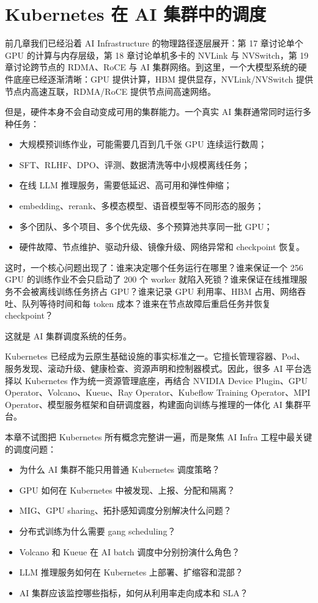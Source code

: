 \chapter{Kubernetes 在 AI 集群中的调度}
\label{chap:k8s-ai-scheduling}

前几章我们已经沿着 AI Infrastructure 的物理路径逐层展开：第 17 章讨论单个 GPU 的计算与内存层级，第 18 章讨论单机多卡的 NVLink 与 NVSwitch，第 19 章讨论跨节点的 RDMA、RoCE 与 AI 集群网络。到这里，一个大模型系统的硬件底座已经逐渐清晰：GPU 提供计算，HBM 提供显存，NVLink/NVSwitch 提供节点内高速互联，RDMA/RoCE 提供节点间高速网络。

但是，硬件本身不会自动变成可用的集群能力。一个真实 AI 集群通常同时运行多种任务：

\begin{itemize}
  \item 大规模预训练作业，可能需要几百到几千张 GPU 连续运行数周；
  \item SFT、RLHF、DPO、评测、数据清洗等中小规模离线任务；
  \item 在线 LLM 推理服务，需要低延迟、高可用和弹性伸缩；
  \item embedding、rerank、多模态模型、语音模型等不同形态的服务；
  \item 多个团队、多个项目、多个优先级、多个预算池共享同一批 GPU；
  \item 硬件故障、节点维护、驱动升级、镜像升级、网络异常和 checkpoint 恢复。
\end{itemize}

这时，一个核心问题出现了：谁来决定哪个任务运行在哪里？谁来保证一个 256 GPU 的训练作业不会只启动了 200 个 worker 就陷入死锁？谁来保证在线推理服务不会被离线训练任务挤占 GPU？谁来记录 GPU 利用率、HBM 占用、网络吞吐、队列等待时间和每 token 成本？谁来在节点故障后重启任务并恢复 checkpoint？

这就是 AI 集群调度系统的任务。

Kubernetes 已经成为云原生基础设施的事实标准之一。它擅长管理容器、Pod、服务发现、滚动升级、健康检查、资源声明和控制器模式。因此，很多 AI 平台选择以 Kubernetes 作为统一资源管理底座，再结合 NVIDIA Device Plugin、GPU Operator、Volcano、Kueue、Ray Operator、Kubeflow Training Operator、MPI Operator、模型服务框架和自研调度器，构建面向训练与推理的一体化 AI 集群平台。

本章不试图把 Kubernetes 所有概念完整讲一遍，而是聚焦 AI Infra 工程中最关键的调度问题：

\begin{itemize}
  \item 为什么 AI 集群不能只用普通 Kubernetes 调度策略？
  \item GPU 如何在 Kubernetes 中被发现、上报、分配和隔离？
  \item MIG、GPU sharing、拓扑感知调度分别解决什么问题？
  \item 分布式训练为什么需要 gang scheduling？
  \item Volcano 和 Kueue 在 AI batch 调度中分别扮演什么角色？
  \item LLM 推理服务如何在 Kubernetes 上部署、扩缩容和混部？
  \item AI 集群应该监控哪些指标，如何从利用率走向成本和 SLA？
\end{itemize}

